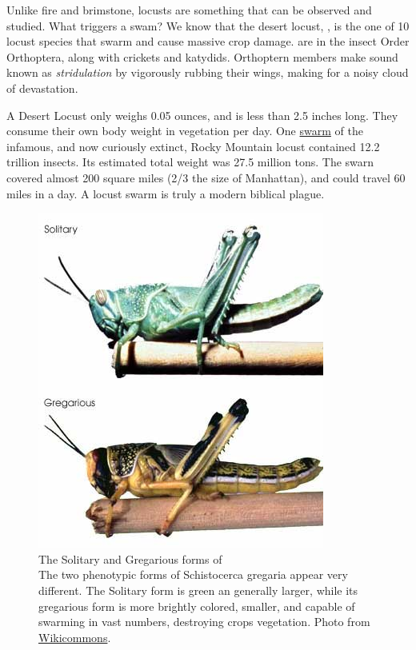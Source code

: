 Unlike fire and brimstone, locusts are something that can be observed and studied. What triggers a swam? We know that the desert locust, \locusts{}, is the one of 10 locust species that swarm and cause massive crop damage. \locusts{} are in the insect Order Orthoptera, along with crickets and katydids. Orthoptern members make sound known as \textit{stridulation} by vigorously rubbing their wings, making for a noisy cloud of devastation.

A Desert Locust only weighs 0.05 ounces, and is less than 2.5 inches long. They consume their own body weight in vegetation per day. One \href{http://animaldiversity.ummz.umich.edu/site/accounts/information/Melanoplus_spretus.html}{swarm} of the infamous, and now curiously extinct, Rocky Mountain locust contained 12.2 trillion insects. Its estimated total weight was 27.5 million tons. The swarn covered almost 200 square miles (2/3 the size of Manhattan), and could travel 60 miles in a day. A locust swarm is truly a modern biblical plague.

\begin{figure}[htbp]
	\centering 
	\includegraphics{Figures/Chapter1/DesertLocust.jpeg}
	\caption[The Solitary and Gregarious forms of \locusts{}]
	{
		The Solitary and Gregarious forms of \locusts{}\\[0.25cm]
		The two phenotypic forms of Schistocerca gregaria appear very different.  The Solitary form is green an generally larger, while its gregarious form is more brightly colored, smaller, and capable of swarming in vast numbers, destroying crops vegetation. Photo from \href{http://www.wikicommons.com}{Wikicommons}.
	}
	\label{fig:Locust}
\end{figure}

